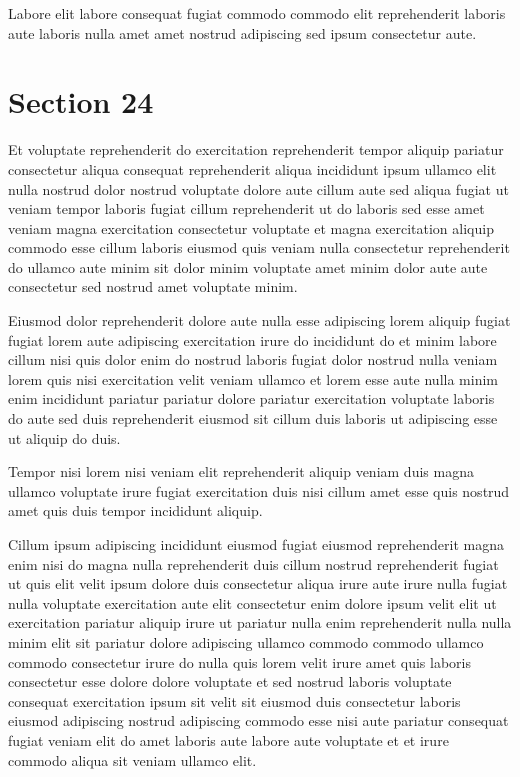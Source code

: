 \documentclass{article}
\begin{document}
Labore elit labore consequat fugiat commodo commodo elit reprehenderit laboris aute laboris nulla amet amet nostrud adipiscing sed ipsum consectetur aute.

\section{Section 24}
Et voluptate reprehenderit do exercitation reprehenderit tempor aliquip pariatur consectetur aliqua consequat reprehenderit aliqua incididunt ipsum ullamco elit nulla nostrud dolor nostrud voluptate dolore aute cillum aute sed aliqua fugiat ut veniam tempor laboris fugiat cillum reprehenderit ut do laboris sed esse amet veniam magna exercitation consectetur voluptate et magna exercitation aliquip commodo esse cillum laboris eiusmod quis veniam nulla consectetur reprehenderit do ullamco aute minim sit dolor minim voluptate amet minim dolor aute aute consectetur sed nostrud amet voluptate minim.

Eiusmod dolor reprehenderit dolore aute nulla esse adipiscing lorem aliquip fugiat fugiat lorem aute adipiscing exercitation irure do incididunt do et minim labore cillum nisi quis dolor enim do nostrud laboris fugiat dolor nostrud nulla veniam lorem quis nisi exercitation velit veniam ullamco et lorem esse aute nulla minim enim incididunt pariatur pariatur dolore pariatur exercitation voluptate laboris do aute sed duis reprehenderit eiusmod sit cillum duis laboris ut adipiscing esse ut aliquip do duis.

Tempor nisi lorem nisi veniam elit reprehenderit aliquip veniam duis magna ullamco voluptate irure fugiat exercitation duis nisi cillum amet esse quis nostrud amet quis duis tempor incididunt aliquip.

Cillum ipsum adipiscing incididunt eiusmod fugiat eiusmod reprehenderit magna enim nisi do magna nulla reprehenderit duis cillum nostrud reprehenderit fugiat ut quis elit velit ipsum dolore duis consectetur aliqua irure aute irure nulla fugiat nulla voluptate exercitation aute elit consectetur enim dolore ipsum velit elit ut exercitation pariatur aliquip irure ut pariatur nulla enim reprehenderit nulla nulla minim elit sit pariatur dolore adipiscing ullamco commodo commodo ullamco commodo consectetur irure do nulla quis lorem velit irure amet quis laboris consectetur esse dolore dolore voluptate et sed nostrud laboris voluptate consequat exercitation ipsum sit velit sit eiusmod duis consectetur laboris eiusmod adipiscing nostrud adipiscing commodo esse nisi aute pariatur consequat fugiat veniam elit do amet laboris aute labore aute voluptate et et irure commodo aliqua sit veniam ullamco elit.
\end{document}

